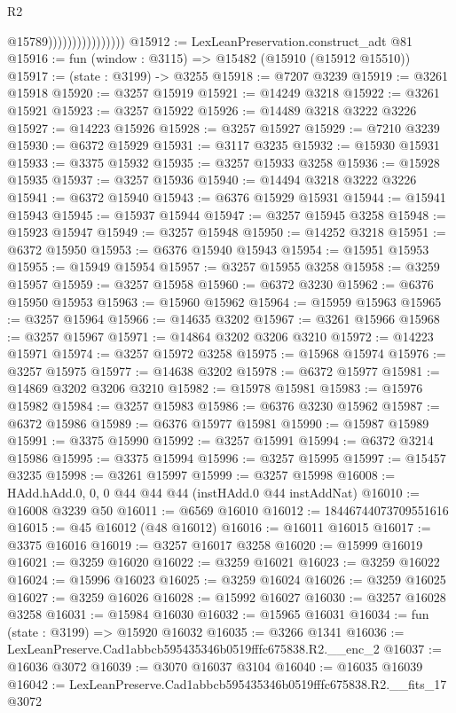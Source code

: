 \begin{lexlean}{R2}
\begin{coremodule}
                                    @15789))))))))))))))))
@15912 := LexLeanPreservation.construct_adt @81
@15916 := fun (window : @3115) => @15482 (@15910 (@15912 @15510))
@15917 := (state : @3199) -> @3255
@15918 := @7207 @3239
@15919 := @3261 @15918
@15920 := @3257 @15919
@15921 := @14249 @3218
@15922 := @3261 @15921
@15923 := @3257 @15922
@15926 := @14489 @3218 @3222 @3226
@15927 := @14223 @15926
@15928 := @3257 @15927
@15929 := @7210 @3239
@15930 := @6372 @15929
@15931 := @3117 @3235
@15932 := @15930 @15931
@15933 := @3375 @15932
@15935 := @3257 @15933 @3258
@15936 := @15928 @15935
@15937 := @3257 @15936
@15940 := @14494 @3218 @3222 @3226
@15941 := @6372 @15940
@15943 := @6376 @15929 @15931
@15944 := @15941 @15943
@15945 := @15937 @15944
@15947 := @3257 @15945 @3258
@15948 := @15923 @15947
@15949 := @3257 @15948
@15950 := @14252 @3218
@15951 := @6372 @15950
@15953 := @6376 @15940 @15943
@15954 := @15951 @15953
@15955 := @15949 @15954
@15957 := @3257 @15955 @3258
@15958 := @3259 @15957
@15959 := @3257 @15958
@15960 := @6372 @3230
@15962 := @6376 @15950 @15953
@15963 := @15960 @15962
@15964 := @15959 @15963
@15965 := @3257 @15964
@15966 := @14635 @3202
@15967 := @3261 @15966
@15968 := @3257 @15967
@15971 := @14864 @3202 @3206 @3210
@15972 := @14223 @15971
@15974 := @3257 @15972 @3258
@15975 := @15968 @15974
@15976 := @3257 @15975
@15977 := @14638 @3202
@15978 := @6372 @15977
@15981 := @14869 @3202 @3206 @3210
@15982 := @15978 @15981
@15983 := @15976 @15982
@15984 := @3257 @15983
@15986 := @6376 @3230 @15962
@15987 := @6372 @15986
@15989 := @6376 @15977 @15981
@15990 := @15987 @15989
@15991 := @3375 @15990
@15992 := @3257 @15991
@15994 := @6372 @3214 @15986
@15995 := @3375 @15994
@15996 := @3257 @15995
@15997 := @15457 @3235
@15998 := @3261 @15997
@15999 := @3257 @15998
@16008 := HAdd.hAdd.{0, 0, 0} @44 @44 @44 (instHAdd.{0} @44 instAddNat)
@16010 := @16008 @3239 @50
@16011 := @6569 @16010
@16012 := 18446744073709551616
@16015 := @45 @16012 (@48 @16012)
@16016 := @16011 @16015
@16017 := @3375 @16016
@16019 := @3257 @16017 @3258
@16020 := @15999 @16019
@16021 := @3259 @16020
@16022 := @3259 @16021
@16023 := @3259 @16022
@16024 := @15996 @16023
@16025 := @3259 @16024
@16026 := @3259 @16025
@16027 := @3259 @16026
@16028 := @15992 @16027
@16030 := @3257 @16028 @3258
@16031 := @15984 @16030
@16032 := @15965 @16031
@16034 := fun (state : @3199) => @15920 @16032
@16035 := @3266 @1341
@16036 := LexLeanPreserve.Cad1abbcb595435346b0519fffc675838.R2.__enc_2
@16037 := @16036 @3072
@16039 := @3070 @16037 @3104
@16040 := @16035 @16039
@16042 := LexLeanPreserve.Cad1abbcb595435346b0519fffc675838.R2.__fits_17 @3072

\end{coremodule}
\end{lexlean}
